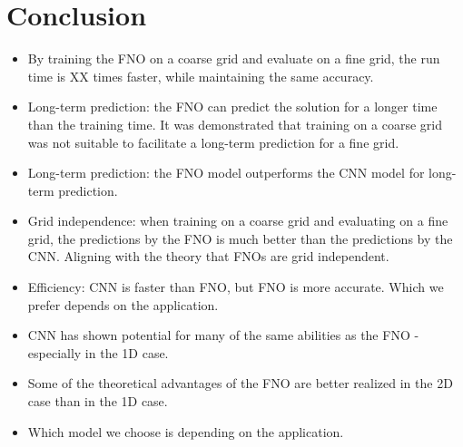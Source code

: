 \chapter{Conclusion}\label{ch:conclusion}


\begin{itemize}
    \item By training the FNO on a coarse grid and evaluate on a fine grid, the run time is XX times faster, while maintaining the same accuracy.
    \item Long-term prediction: the FNO can predict the solution for a longer time than the training time.
    It was demonstrated that training on a coarse grid was not suitable to facilitate a long-term prediction for a fine grid.
    \item Long-term prediction: the FNO model outperforms the CNN model for long-term prediction.
    \item Grid independence: when training on a coarse grid and evaluating on a fine grid, the predictions by the FNO is much better than the predictions by the CNN. Aligning with the theory that FNOs are grid independent.
    \item Efficiency: CNN is faster than FNO, but FNO is more accurate. Which we prefer depends on the application.
    \item CNN has shown potential for many of the same abilities as the FNO - especially in the 1D case.
    \item Some of the theoretical advantages of the FNO are better realized in the 2D case than in the 1D case.
    \item Which model we choose is depending on the application.
\end{itemize}





